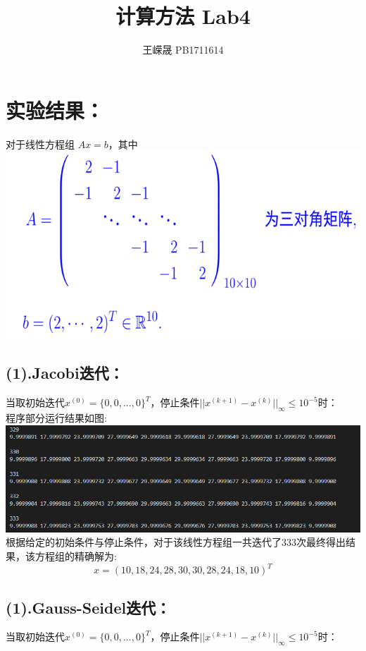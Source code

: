 \documentclass{article}
\title{计算方法 Lab4}
\author{王嵘晟 \quad PB1711614}
\date{}
\begin{document}
	\maketitle
	\Large\section{实验结果：}
	对于线性方程组 $Ax=b$，其中\\
	\includegraphics*[scale = 0.35]{1.png}\\
	\large\subsection*{(1).Jacobi迭代：}
	当取初始迭代$x^{(0)}=\{0,0,...,0\}^{T}$，停止条件$||x^{(k+1)}-x^{(k)}||_{\infty}\le 10^{-5}$时：\\
	程序部分运行结果如图:\\
	\includegraphics*[scale = 0.5]{2.png}\\
	根据给定的初始条件与停止条件，对于该线性方程组一共迭代了333次最终得出结果，该方程组的精确解为:\\
	$$x=(10,18,24,28,30,30,28,24,18,10)^{T}$$
	\large\subsection*{(1).Gauss-Seidel迭代：}
	当取初始迭代$x^{(0)}=\{0,0,...,0\}^{T}$，停止条件$||x^{(k+1)}-x^{(k)}||_{\infty}\le 10^{-5}$时：\\
\end{document}
